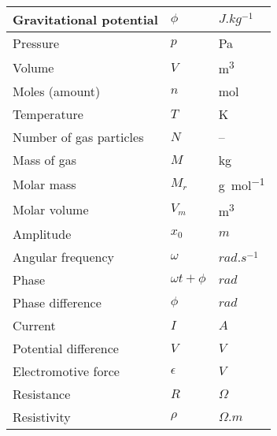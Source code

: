 \documentclass[12pt,a4 paper]{article}
\begin{document}
\begin{longtable}[H]{p{} p{} p{}}
Gravitational potential & $\phi$ & $\unit{J.kg^{-1}}$ \\*
\midrule
Pressure & $p$ & \unit{Pa} \\*
Volume & $V$ & \unit{m^3} \\*
Moles (amount) & $n$ & \unit{mol} \\*
Temperature & $T$ & \unit{K} \\*
Number of gas particles & $N$ & -- \\*
Mass of gas & $M$ & \unit{kg} \\*
Molar mass & $M_r$ & \unit{g.mol^{-1}} \\*
Molar volume & $V_m$ & \unit{m^3} \\*
\midrule
Amplitude & $x_0$ & $\unit{m}$ \\*
Angular frequency & $\omega$ & $\unit{rad.s^{-1}}$ \\*
Phase & $\omega t+\phi$ & $\unit{rad}$ \\*
Phase difference & $\phi$ & $\unit{rad}$ \\*
\midrule
Current & $I$ & $A$ \\*
Potential difference & $V$ & $V$ \\*
Electromotive force & $\epsilon$ & $V$ \\*
Resistance & $R$ & $\Omega$ \\*
Resistivity & $\rho$ & $\unit{\Omega.m}$ \\*
\midrule
\end{longtable}
\end{document}
